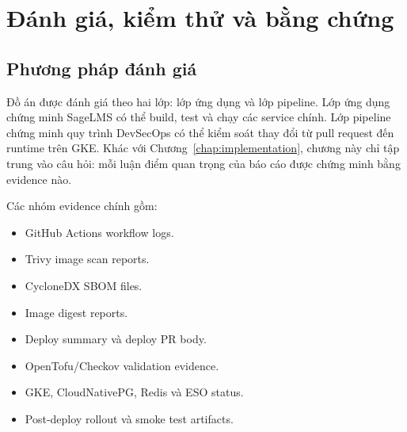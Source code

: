 \chapter{Đánh giá, kiểm thử và bằng chứng}
\label{chap:evaluation}

\section{Phương pháp đánh giá}

Đồ án được đánh giá theo hai lớp: lớp ứng dụng và lớp pipeline. Lớp ứng dụng chứng minh SageLMS có thể build, test và chạy các service chính. Lớp pipeline chứng minh quy trình DevSecOps có thể kiểm soát thay đổi từ pull request đến runtime trên GKE. Khác với Chương~\ref{chap:implementation}, chương này chỉ tập trung vào câu hỏi: mỗi luận điểm quan trọng của báo cáo được chứng minh bằng evidence nào.

Các nhóm evidence chính gồm:

\begin{itemize}
  \item GitHub Actions workflow logs.
  \item Trivy image scan reports.
  \item CycloneDX SBOM files.
  \item Image digest reports.
  \item Deploy summary và deploy PR body.
  \item OpenTofu/Checkov validation evidence.
  \item GKE, CloudNativePG, Redis và ESO status.
  \item Post-deploy rollout và smoke test artifacts.
\end{itemize}

